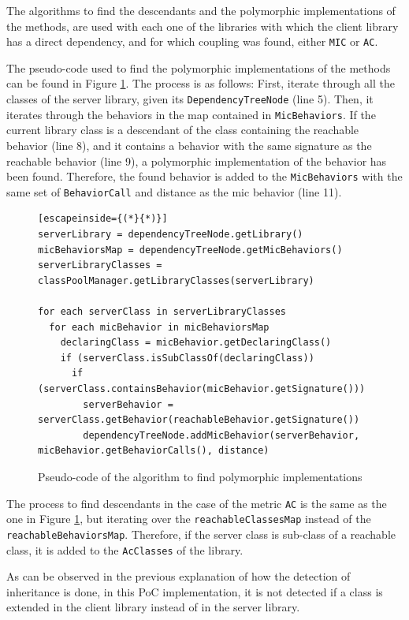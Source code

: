 The algorithms to find the descendants and the polymorphic implementations of the methods, are used with each one of the libraries with which the client library has a direct dependency, and for which coupling was found, either \texttt{MIC} or \texttt{AC}.

The pseudo-code used to find the polymorphic implementations of the methods can be found in Figure \ref{fig:algorithm-polymorphy}. The process is as follows: First, iterate through all the classes of the server library, given its \texttt{DependencyTreeNode} (line 5). Then, it iterates through the behaviors in the map contained in \texttt{MicBehaviors}. If the current library class is a descendant of the class containing the reachable behavior (line 8), and it contains a behavior with the same signature as the reachable behavior (line 9), a polymorphic implementation of the behavior has been found. Therefore, the found behavior is added to the \texttt{MicBehaviors} with the same set of \texttt{BehaviorCall} and distance as the mic behavior (line 11).

\begin{figure}[ht!]
\begin{lstlisting}[escapeinside={(*}{*)}]
serverLibrary = dependencyTreeNode.getLibrary()
micBehaviorsMap = dependencyTreeNode.getMicBehaviors()
serverLibraryClasses = classPoolManager.getLibraryClasses(serverLibrary)

for each serverClass in serverLibraryClasses
  for each micBehavior in micBehaviorsMap
    declaringClass = micBehavior.getDeclaringClass()
    if (serverClass.isSubClassOf(declaringClass))
      if (serverClass.containsBehavior(micBehavior.getSignature()))
        serverBehavior = serverClass.getBehavior(reachableBehavior.getSignature())
        dependencyTreeNode.addMicBehavior(serverBehavior, micBehavior.getBehaviorCalls(), distance)
\end{lstlisting}
\caption{Pseudo-code of the algorithm to find polymorphic implementations}
\label{fig:algorithm-polymorphy}
\end{figure}

The process to find descendants in the case of the metric \texttt{AC} is the same as the one in Figure \ref{fig:algorithm-polymorphy}, but iterating over the \texttt{reachableClassesMap} instead of the \texttt{reachableBehaviorsMap}. Therefore, if the server class is sub-class of a reachable class, it is added to the \texttt{AcClasses} of the library.

\blankl
As can be observed in the previous explanation of how the detection of inheritance is done, in this PoC implementation, it is not detected if a class is extended in the client library instead of in the server library.

